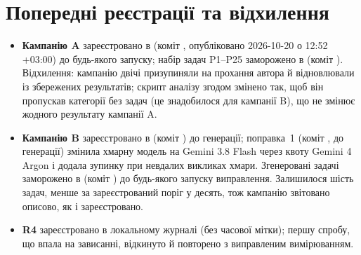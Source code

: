 \documentclass[11pt]{article}
\begin{document}
\section{Попередні реєстрації та відхилення}\label{app:prereg}
\begin{itemize}
\item \textbf{Кампанію A} зареєстровано в  (коміт , опубліковано 2026-10-20 о 12:52 +03:00) до будь-якого запуску; набір задач P1--P25 заморожено в  (коміт ). Відхилення: кампанію двічі призупиняли на прохання автора й відновлювали із збережених результатів; скрипт аналізу згодом змінено так, щоб він пропускав категорії без задач (це знадобилося для кампанії B), що не змінює жодного результату кампанії A.
\item \textbf{Кампанію B} зареєстровано в  (коміт ) до генерації; поправка~1 (коміт , до генерації) змінила хмарну модель на Gemini 3.8 Flash через квоту Gemini 4 Argon і додала зупинку при невдалих викликах хмари. Згенеровані задачі заморожено в  (коміт ) до будь-якого запуску виправлення. Залишилося шість задач, менше за зареєстрований поріг у десять, тож кампанію звітовано описово, як і зареєстровано.
\item \textbf{R4} зареєстровано в локальному журналі (без часової мітки); першу спробу, що впала на зависанні, відкинуто й повторено з виправленим вимірюванням.
\end{itemize}

\clearpage
\end{document}

